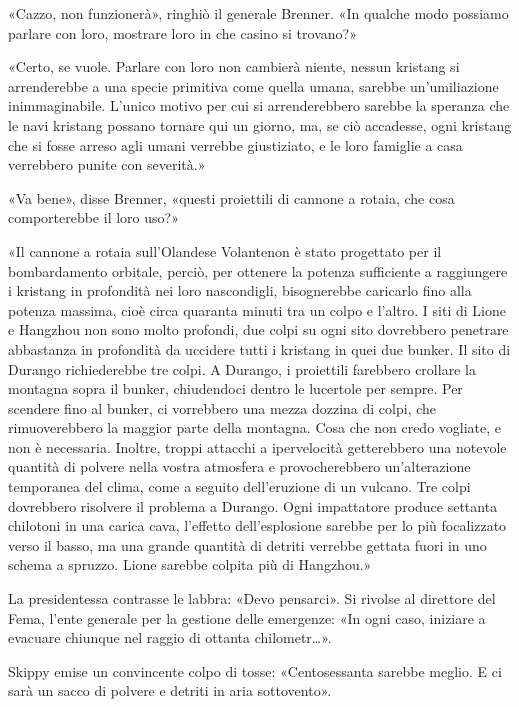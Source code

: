 «Cazzo, non funzionerà», ringhiò il generale Brenner. «In qualche modo
possiamo parlare con loro, mostrare loro in che casino si trovano?»

«Certo, se vuole. Parlare con loro non cambierà niente, nessun kristang
si arrenderebbe a una specie primitiva come quella umana, sarebbe
un'umiliazione inimmaginabile. L'unico motivo per cui si arrenderebbero
sarebbe la speranza che le navi kristang possano tornare qui un giorno,
ma, se ciò accadesse, ogni kristang che si fosse arreso agli umani
verrebbe giustiziato, e le loro famiglie a casa verrebbero punite con
severità.»

«Va bene», disse Brenner, «questi proiettili di cannone a rotaia, che
cosa comporterebbe il loro uso?»

«Il cannone a rotaia sull'Olandese Volantenon è stato progettato per il
bombardamento orbitale, perciò, per ottenere la potenza sufficiente a
raggiungere i kristang in profondità nei loro nascondigli, bisognerebbe
caricarlo fino alla potenza massima, cioè circa quaranta minuti tra un
colpo e l'altro. I siti di Lione e Hangzhou non sono molto profondi, due
colpi su ogni sito dovrebbero penetrare abbastanza in profondità da
uccidere tutti i kristang in quei due bunker. Il sito di Durango
richiederebbe tre colpi. A Durango, i proiettili farebbero crollare la
montagna sopra il bunker, chiudendoci dentro le lucertole per sempre.
Per scendere fino al bunker, ci vorrebbero una mezza dozzina di colpi,
che rimuoverebbero la maggior parte della montagna. Cosa che non credo
vogliate, e non è necessaria. Inoltre, troppi attacchi a ipervelocità
getterebbero una notevole quantità di polvere nella vostra atmosfera e
provocherebbero un'alterazione temporanea del clima, come a seguito
dell'eruzione di un vulcano. Tre colpi dovrebbero risolvere il problema
a Durango. Ogni impattatore produce settanta chilotoni in una carica
cava, l'effetto dell'esplosione sarebbe per lo più focalizzato verso il
basso, ma una grande quantità di detriti verrebbe gettata fuori in uno
schema a spruzzo. Lione sarebbe colpita più di Hangzhou.»

La presidentessa contrasse le labbra: «Devo pensarci». Si rivolse al
direttore del Fema, l'ente generale per la gestione delle emergenze: «In
ogni caso, iniziare a evacuare chiunque nel raggio di ottanta
chilometr\ldots».

Skippy emise un convincente colpo di tosse: «Centosessanta sarebbe
meglio. E ci sarà un sacco di polvere e detriti in aria sottovento».

